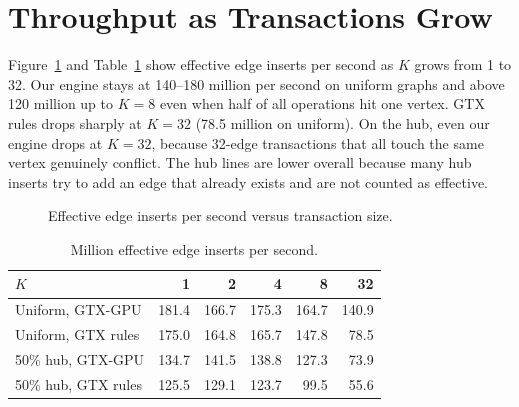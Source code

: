 \documentclass[11pt,a4paper,oneside]{report}
\newcommand{\sys}{GTX-GPU}
\begin{document}
\section{Throughput as Transactions Grow}
Figure~\ref{fig:ksweep} and Table~\ref{tab:ksweep} show effective edge inserts per second as $K$ grows from 1 to 32.
Our engine stays at 140--180 million per second on uniform graphs and above 120 million up to $K=8$ even when half of
all operations hit one vertex. GTX rules drops sharply at $K=32$ (78.5 million on uniform). On the hub, even our engine
drops at $K=32$, because 32-edge transactions that all touch the same vertex genuinely conflict. The hub lines are lower
overall because many hub inserts try to add an edge that already exists and are not counted as effective.

\begin{figure}[H]
\centering
{}
\caption{Effective edge inserts per second versus transaction size.}
\label{fig:ksweep}
\end{figure}

\begin{table}[H]
\caption{Million effective edge inserts per second.}
\label{tab:ksweep}
\small
\begin{singlespace}
\centering
\begin{tabular}{@{}lrrrrr@{}}
\toprule
$K$ & 1 & 2 & 4 & 8 & 32 \\
\midrule
Uniform, \sys{} & 181.4 & 166.7 & 175.3 & 164.7 & 140.9 \\
Uniform, GTX rules & 175.0 & 164.8 & 165.7 & 147.8 & 78.5 \\
50\% hub, \sys{} & 134.7 & 141.5 & 138.8 & 127.3 & 73.9 \\
50\% hub, GTX rules & 125.5 & 129.1 & 123.7 & 99.5 & 55.6 \\
\bottomrule
\end{tabular}
\end{singlespace}
\end{table}
\end{document}
